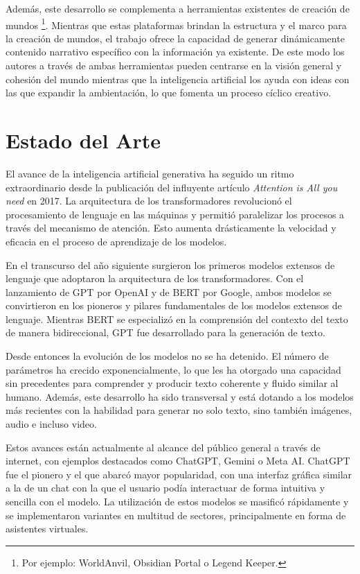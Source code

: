 Además, este desarrollo se complementa a herramientas existentes de creación de mundos
\footnote{Por ejemplo: WorldAnvil, Obsidian Portal o Legend Keeper.}.
Mientras que estas plataformas brindan la estructura y el marco para la creación de mundos,
el trabajo ofrece la capacidad de generar dinámicamente contenido narrativo específico con la información ya existente.
De este modo los autores a través de ambas herramientas pueden centrarse en la visión general y cohesión del mundo mientras que la inteligencia artificial 
los ayuda con ideas con las que expandir la ambientación, lo que fomenta un proceso cíclico creativo.


\section{Estado del Arte}
El avance de la inteligencia artificial generativa ha seguido un ritmo extraordinario desde
la publicación del influyente artículo \textit{Attention is All you need} \cite{att_is_all_you_need}
en 2017.
La arquitectura de los transformadores revolucionó el procesamiento de lenguaje en las máquinas y
permitió paralelizar los procesos a través del mecanismo de atención.
Esto aumenta drásticamente la velocidad y eficacia en el proceso de aprendizaje de los modelos.

En el transcurso del año siguiente surgieron los primeros modelos extensos de lenguaje
que adoptaron la arquitectura de los transformadores.
Con el lanzamiento de GPT\cite{Radford2018GPT1} por OpenAI y de BERT\cite{Devlin2019BERT} por Google, ambos modelos se convirtieron
en los pioneros y pilares fundamentales de los modelos extensos de lenguaje.
Mientras BERT se especializó en la comprensión del contexto del texto de manera bidireccional, GPT
fue desarrollado para la generación de texto.

Desde entonces la evolución de los modelos no se ha detenido. El número de parámetros
ha crecido exponencialmente, lo que les ha otorgado una capacidad sin precedentes para comprender y
producir texto coherente y fluido similar al humano.
Además, este desarrollo ha sido transversal y está dotando a los modelos más recientes 
con la habilidad para generar no solo texto, sino también imágenes, audio e incluso video.

Estos avances están actualmente al alcance del público general a través de internet, con ejemplos destacados
como ChatGPT\cite{OpenAIChatGPT2022}, Gemini\cite{GeminiTeam2023Gemini} o Meta AI\cite{MetaAIAbout}.
ChatGPT fue el pionero y el que abarcó mayor popularidad,
con una interfaz gráfica similar a la de un chat con la que el usuario podía interactuar de forma intuitiva
y sencilla con el modelo. La utilización de estos modelos se masificó rápidamente y se implementaron variantes
en multitud de sectores, principalmente en forma de asistentes virtuales.

